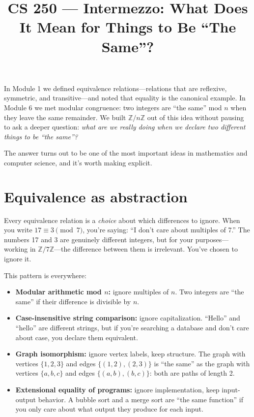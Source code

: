 \documentclass[11pt]{article}
\title{CS 250 --- Intermezzo: What Does It Mean for Things to Be ``The Same''?}
\author{}
\date{}
\begin{document}
\maketitle

In Module 1 we defined equivalence relations---relations that are reflexive, symmetric, and transitive---and noted that equality is the canonical example. In Module 6 we met modular congruence: two integers are ``the same'' mod $n$ when they leave the same remainder. We built $\mathbb{Z}/n\mathbb{Z}$ out of this idea without pausing to ask a deeper question: \emph{what are we really doing when we declare two different things to be ``the same''?}

The answer turns out to be one of the most important ideas in mathematics and computer science, and it's worth making explicit.

\section{Equivalence as abstraction}

Every equivalence relation is a \emph{choice} about which differences to ignore. When you write $17 \equiv 3 \pmod{7}$, you're saying: ``I don't care about multiples of 7.'' The numbers 17 and 3 are genuinely different integers, but for your purposes---working in $\mathbb{Z}/7\mathbb{Z}$---the difference between them is irrelevant. You've chosen to ignore it.

This pattern is everywhere:
\begin{itemize}
  \item \textbf{Modular arithmetic mod $n$:} ignore multiples of $n$. Two integers are ``the same'' if their difference is divisible by $n$.
  \item \textbf{Case-insensitive string comparison:} ignore capitalization. ``Hello'' and ``hello'' are different strings, but if you're searching a database and don't care about case, you declare them equivalent.
  \item \textbf{Graph isomorphism:} ignore vertex labels, keep structure.
  The graph with vertices $\{1, 2, 3\}$ and edges
  $\{(1,2), (2,3)\}$ is ``the same'' as the graph with vertices
  $\{a, b, c\}$ and edges $\{(a,b), (b,c)\}$: both are paths of
  length 2.
  \item \textbf{Extensional equality of programs:} ignore implementation, keep input-output behavior. A bubble sort and a merge sort are ``the same function'' if you only care about what output they produce for each input.
\end{itemize}
\end{document}
